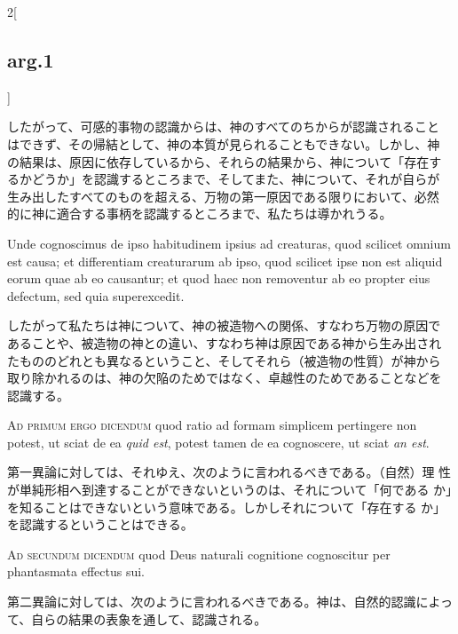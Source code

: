 \documentclass[paper=a4paper,fontsize=10pt,jafontsize=9pt,titlepage]{jlreq}
\begin{document}
\begin{paracol}{2}[\subsection{arg.1}]
\switchcolumn

したがって、可感的事物の認識からは、神のすべてのちからが認識されること
はできず、その帰結として、神の本質が見られることもできない。しかし、神
の結果は、原因に依存しているから、それらの結果から、神について「存在す
るかどうか」を認識するところまで、そしてまた、神について、それが自らが
生み出したすべてのものを超える、万物の第一原因である限りにおいて、必然
的に神に適合する事柄を認識するところまで、私たちは導かれうる。

\switchcolumn*

Unde cognoscimus de ipso habitudinem ipsius ad creaturas, quod
scilicet omnium est causa; et differentiam creaturarum ab ipso, quod
scilicet ipse non est aliquid eorum quae ab eo causantur; et quod haec
non removentur ab eo propter eius defectum, sed quia superexcedit.

\switchcolumn

したがって私たちは神について、神の被造物への関係、すなわち万物の原因で
あることや、被造物の神との違い、すなわち神は原因である神から生み出され
たもののどれとも異なるということ、そしてそれら（被造物の性質）が神から
取り除かれるのは、神の欠陥のためではなく、卓越性のためであることなどを
認識する。

\switchcolumn*[\subsection{ad.1}]

{\scshape Ad primum ergo dicendum} quod ratio ad formam simplicem
pertingere non potest, ut sciat de ea {\itshape quid est}, potest tamen de
ea cognoscere, ut sciat {\itshape an est}.

\switchcolumn

第一異論に対しては、それゆえ、次のように言われるべきである。（自然）理
性が単純形相へ到達することができないというのは、それについて「何である
か」を知ることはできないという意味である。しかしそれについて「存在する
か」を認識するということはできる。

\switchcolumn*[\subsection{ad.2}]

{\scshape Ad secundum dicendum} quod Deus naturali cognitione cognoscitur
per phantasmata effectus sui.

\switchcolumn

第二異論に対しては、次のように言われるべきである。神は、自然的認識によっ
て、自らの結果の表象を通して、認識される。


\end{paracol}
\end{document}
